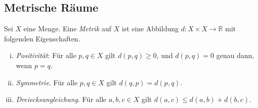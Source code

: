 \documentclass[../main.tex]{subfiles}
\begin{document}
\subsection*{Metrische Räume}
\begin{definition}
  Sei $X$ eine Menge. Eine \emph{Metrik} auf $X$ ist eine
  Abbildung $d \colon X \times X \to \mathbb{R}$
  mit folgenden Eigenschaften.
  \begin{enumerate}[(i)]
    \item \emph{Positivität}: Für alle $p, q \in X$ gilt $d(p, q) \geq 0$, und
      $d(p, q) = 0$ genau dann, wenn $p = q$.
    \item \emph{Symmetrie}. Für alle $p, q \in X$ gilt $d(q, p) = d(p, q)$.
    \item \emph{Dreiecksungleichung}. 
      Für alle  $a, b, c \in X$ gilt $d(a, c) \leq d(a, b) + 
      d(b, c)$.
  \end{enumerate}
\end{definition}
\end{document}
